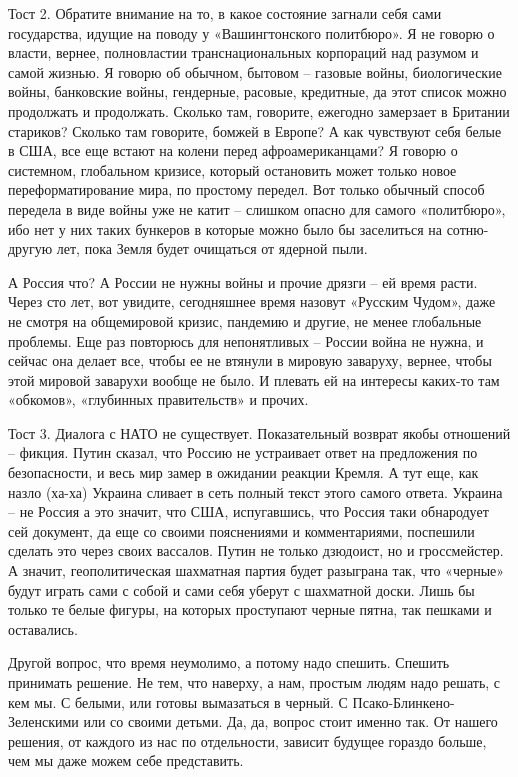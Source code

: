 Тост 2. Обратите внимание на то, в какое состояние загнали себя сами
государства, идущие на поводу у «Вашингтонского политбюро». Я не говорю о
власти, вернее, полновластии транснациональных корпораций над разумом и самой
жизнью. Я говорю об обычном, бытовом – газовые войны, биологические войны,
банковские войны, гендерные, расовые, кредитные, да этот список можно
продолжать и продолжать. Сколько там, говорите, ежегодно замерзает в Британии
стариков? Сколько там говорите, бомжей в Европе? А как чувствуют себя белые в
США, все еще встают на колени перед афроамериканцами? Я говорю о системном,
глобальном кризисе, который остановить может только новое переформатирование
мира, по простому передел. Вот только обычный способ передела в виде войны уже
не катит – слишком опасно для самого «политбюро», ибо нет у них таких бункеров
в которые можно было бы заселиться на сотню-другую лет, пока Земля будет
очищаться от ядерной пыли.

А Россия что? А России не нужны войны и прочие дрязги – ей время расти. Через
сто лет, вот увидите, сегодняшнее время назовут «Русским Чудом», даже не смотря
на общемировой кризис, пандемию и другие, не менее глобальные проблемы. Еще раз
повторюсь для непонятливых – России война не нужна, и сейчас она делает все,
чтобы ее не втянули в мировую заваруху, вернее, чтобы этой мировой заварухи
вообще не было. И плевать ей на интересы каких-то там «обкомов», «глубинных
правительств» и прочих.

Тост 3. Диалога с НАТО не существует. Показательный возврат якобы отношений –
фикция. Путин сказал, что Россию не устраивает ответ на предложения по
безопасности, и весь мир замер в ожидании реакции Кремля. А тут еще, как назло
(ха-ха) Украина сливает в сеть полный текст этого самого ответа. Украина – не
Россия а это значит, что США, испугавшись, что Россия таки обнародует сей
документ, да еще со своими пояснениями и комментариями, поспешили сделать это
через своих вассалов. Путин не только дзюдоист, но и гроссмейстер. А значит,
геополитическая шахматная партия будет разыграна так, что «черные» будут играть
сами с собой и сами себя уберут с шахматной доски. Лишь бы только те белые
фигуры, на которых проступают черные пятна, так пешками и оставались.

Другой вопрос, что время неумолимо, а потому надо спешить. Спешить принимать
решение. Не тем, что наверху, а нам, простым людям надо решать, с кем мы. С
белыми, или готовы вымазаться в черный. С Псако-Блинкено-Зеленскими или со
своими детьми. Да, да, вопрос стоит именно так. От нашего решения, от каждого
из нас по отдельности, зависит будущее гораздо больше, чем мы даже можем себе
представить.

